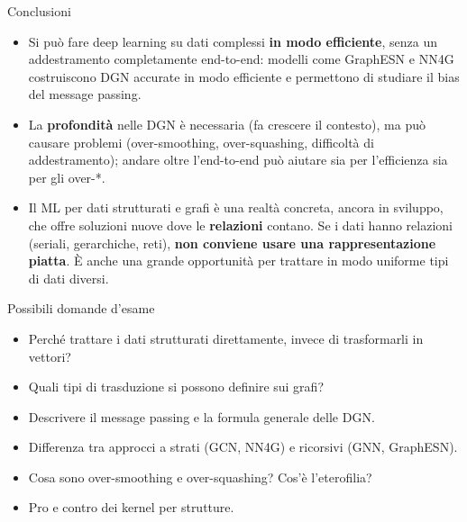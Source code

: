\begin{boxabstract}{Conclusioni}

\begin{itemize}
\tightlist
\item
  Si può fare deep learning su dati complessi \textbf{in modo
  efficiente}, senza un addestramento completamente end-to-end: modelli
  come GraphESN e NN4G costruiscono DGN accurate in modo efficiente e
  permettono di studiare il bias del message passing.
\item
  La \textbf{profondità} nelle DGN è necessaria (fa crescere il
  contesto), ma può causare problemi (over-smoothing, over-squashing,
  difficoltà di addestramento); andare oltre l'end-to-end può aiutare
  sia per l'efficienza sia per gli over-*.
\item
  Il ML per dati strutturati e grafi è una realtà concreta, ancora in
  sviluppo, che offre soluzioni nuove dove le \textbf{relazioni}
  contano. Se i dati hanno relazioni (seriali, gerarchiche, reti),
  \textbf{non conviene usare una rappresentazione piatta}. È anche una
  grande opportunità per trattare in modo uniforme tipi di dati diversi.
\end{itemize}

\end{boxabstract}

\begin{boxquestion}{Possibili domande d'esame}

\begin{itemize}
\tightlist
\item
  Perché trattare i dati strutturati direttamente, invece di
  trasformarli in vettori?
\item
  Quali tipi di trasduzione si possono definire sui grafi?
\item
  Descrivere il message passing e la formula generale delle DGN.
\item
  Differenza tra approcci a strati (GCN, NN4G) e ricorsivi (GNN,
  GraphESN).
\item
  Cosa sono over-smoothing e over-squashing? Cos'è l'eterofilia?
\item
  Pro e contro dei kernel per strutture.
\end{itemize}

\end{boxquestion}
